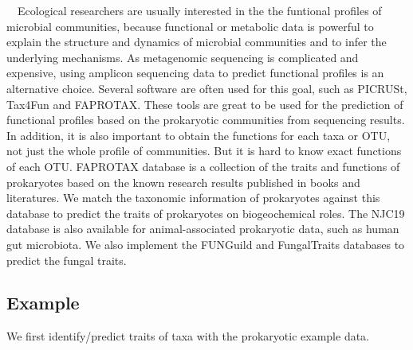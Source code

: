\documentclass[
]{book}
\newenvironment{Shaded}{\begin{snugshade}}{\end{snugshade}}
\newcommand{\AttributeTok}[1]{\textcolor[rgb]{0.77,0.63,0.00}{#1}}
\newcommand{\CommentTok}[1]{\textcolor[rgb]{0.56,0.35,0.01}{\textit{#1}}}
\newcommand{\FunctionTok}[1]{\textcolor[rgb]{0.00,0.00,0.00}{#1}}
\newcommand{\NormalTok}[1]{#1}
\newcommand{\OtherTok}[1]{\textcolor[rgb]{0.56,0.35,0.01}{#1}}
\newcommand{\SpecialCharTok}[1]{\textcolor[rgb]{0.00,0.00,0.00}{#1}}
\newcommand{\StringTok}[1]{\textcolor[rgb]{0.31,0.60,0.02}{#1}}
\begin{document}
　Ecological researchers are usually interested in the the funtional profiles of microbial communities,
because functional or metabolic data is powerful to explain the structure and dynamics of microbial communities and to infer the underlying mechanisms.
As metagenomic sequencing is complicated and expensive, using amplicon sequencing data to predict functional profiles is an alternative choice.
Several software are often used for this goal, such as PICRUSt\citep{Langille_Predictive_2013}, Tax4Fun\citep{Aßhauer_Tax4Fun_2015} and FAPROTAX\citep{Louca_High_2016, Louca_Decoupling_2016}.
These tools are great to be used for the prediction of functional profiles based on the prokaryotic communities from sequencing results.
In addition, it is also important to obtain the functions for each taxa or OTU, not just the whole profile of communities.
But it is hard to know exact functions of each OTU.
FAPROTAX database is a collection of the traits and functions of prokaryotes based on the known research results published in books and literatures.
We match the taxonomic information of prokaryotes against this database to predict the traits of prokaryotes on biogeochemical roles.
The NJC19 database\citep{Lim_Large_2020} is also available for animal-associated prokaryotic data, such as human gut microbiota.
We also implement the FUNGuild \citep{Nguyen_FUNGuild_2016} and FungalTraits \citep{Polme_FungalTraits_2020} databases to predict the fungal traits.

\hypertarget{example-9}{%
\subsection{Example}\label{example-9}}

We first identify/predict traits of taxa with the prokaryotic example data.

\begin{Shaded}
\end{Shaded}
\end{document}
